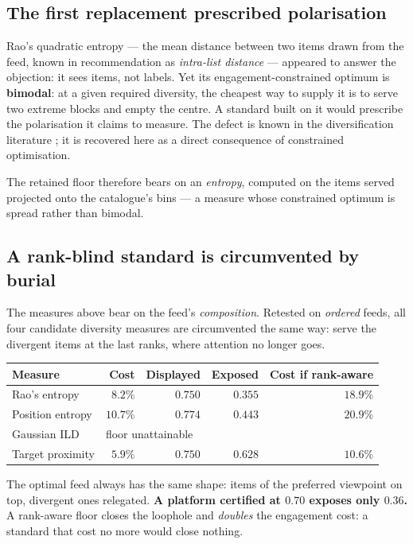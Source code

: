 \documentclass[11pt,a4paper]{article}
\begin{document}
\subsection{The first replacement prescribed polarisation}

Rao's quadratic entropy \citep{rao1982} --- the mean distance between two items drawn from the
feed, known in recommendation as \emph{intra-list distance} --- appeared to answer the
objection: it sees items, not labels. Yet its engagement-constrained optimum is
\textbf{bimodal}: at a given required diversity, the cheapest way to supply it is to serve two
extreme blocks and empty the centre. A standard built on it would prescribe the polarisation it
claims to measure. The defect is known in the diversification literature
\citep{ohsaka2023}; it is recovered here as a direct consequence of constrained optimisation.

The retained floor therefore bears on an \emph{entropy}, computed on the items served projected
onto the catalogue's bins --- a measure whose constrained optimum is spread rather than bimodal.

\subsection{A rank-blind standard is circumvented by burial}

The measures above bear on the feed's \emph{composition}. Retested on \emph{ordered} feeds, all
four candidate diversity measures are circumvented the same way: serve the divergent items at
the last ranks, where attention no longer goes.

\begin{center}
\begin{tabular}{@{}lrrrr@{}}
\toprule
\textbf{Measure} & \textbf{Cost} & \textbf{Displayed} & \textbf{Exposed} & \textbf{Cost if rank-aware} \\
\midrule
Rao's entropy & $8.2\%$ & $0.750$ & $\mathbf{0.355}$ & $18.9\%$ \\
Position entropy & $10.7\%$ & $0.774$ & $\mathbf{0.443}$ & $20.9\%$ \\
Gaussian ILD & \multicolumn{4}{l}{floor unattainable} \\
Target proximity & $5.9\%$ & $0.750$ & $\mathbf{0.628}$ & $10.6\%$ \\
\bottomrule
\end{tabular}
\end{center}

The optimal feed always has the same shape: items of the preferred viewpoint on top, divergent
ones relegated. \textbf{A platform certified at $0.70$ exposes only $0.36$.} A rank-aware floor
closes the loophole and \emph{doubles} the engagement cost: a standard that cost no more would
close nothing.
\end{document}
